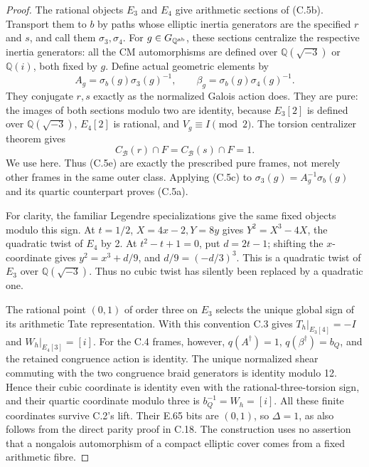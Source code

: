 \begin{proof}
The rational objects \(E_3\) and \(E_4\) give arithmetic
sections of (C.5b). Transport them to \(b\) by paths
whose elliptic inertia generators are the specified
\(r\) and \(s\), and call them \(\sigma_3,\sigma_4\).
For \(g\in G_{\mathbb Q^{\rm ab}}\), these sections
centralize the respective inertia generators: all the
CM automorphisms are defined over
\(\mathbb Q(\sqrt{-3})\) or \(\mathbb Q(i)\), both fixed
by \(g\). Define actual geometric elements by
\[
 A_g=\sigma_b(g)\sigma_3(g)^{-1},\qquad
 \beta_g=\sigma_b(g)\sigma_4(g)^{-1}.
 \tag{C.5e}
\]
They conjugate \(r,s\) exactly as the normalized
Galois action does. They are pure: the images of both
sections modulo two are identity, because
\(E_3[2]\) is defined over \(\mathbb Q(\sqrt{-3})\),
\(E_4[2]\) is rational, and \(V_g\equiv I\pmod2\).
The torsion centralizer theorem gives
\[
 C_{\mathcal B}(r)\cap F=C_{\mathcal B}(s)\cap F=1.
\]
We use \citet[Theorem B']{cHerfortRibes1985} here.
Thus (C.5e) are exactly the prescribed pure frames,
not merely other frames in the same outer class.
Applying (C.5c) to
\(\sigma_3(g)=A_g^{-1}\sigma_b(g)\) and its quartic
counterpart proves (C.5a).

For clarity, the familiar Legendre specializations give
the same fixed objects modulo this sign. At \(t=1/2\),
\(X=4x-2,Y=8y\) gives \(Y^2=X^3-4X\), the
quadratic twist of \(E_4\) by 2. At
\(t^2-t+1=0\), put \(d=2t-1\); shifting the
\(x\)-coordinate gives
\(y^2=x^3+d/9\), and \(d/9=(-d/3)^3\).
This is a quadratic twist of \(E_3\) over
\(\mathbb Q(\sqrt{-3})\). Thus no cubic twist has
silently been replaced by a quadratic one.

The rational point \((0,1)\) of order three on \(E_3\)
selects the unique global sign of its arithmetic Tate
representation. With this convention C.3 gives
\(T_h|_{E_3[4]}=-I\) and \(W_h|_{E_4[3]}=[i]\).
For the C.4 frames, however,
\(q(A^\dagger)=1\), \(q(\beta^\dagger)=b_Q\),
and the retained congruence action is identity.
The unique normalized shear commuting with the two
congruence braid generators is identity modulo 12.
Hence their cubic coordinate is identity even with
the rational-three-torsion sign, and their quartic
coordinate modulo three is \(b_Q^{-1}=W_h=[i]\).
All these finite coordinates survive C.2's lift.
Their E.65 bits are \((0,1)\), so \(\Delta=1\),
as also follows from the direct parity proof in C.18.
The construction uses no assertion that a nongalois
automorphism of a compact elliptic cover comes from
a fixed arithmetic fibre.
\end{proof}


